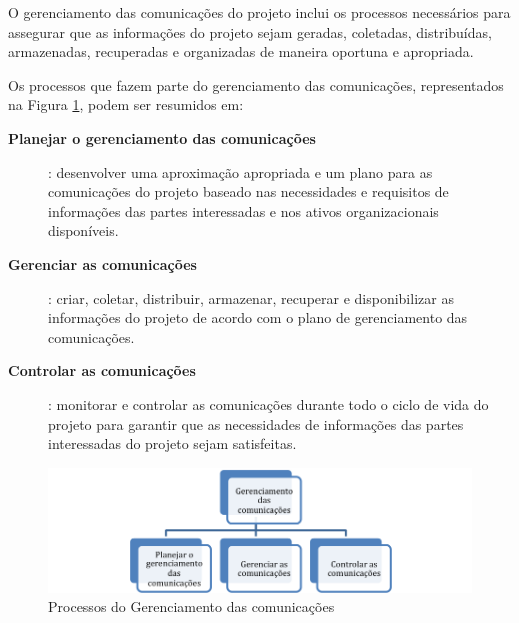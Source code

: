 


O gerenciamento das comunicações do projeto inclui os processos necessários para assegurar que as informações do projeto sejam geradas, coletadas, distribuídas, armazenadas, recuperadas e organizadas de maneira oportuna e apropriada.

Os processos que fazem parte do gerenciamento das comunicações, representados na Figura \ref{fig:proc:ger:comunic}, podem ser resumidos em:

\begin{description}
	
	\item[\textbf{Planejar o gerenciamento das comunicações}]: desenvolver uma aproximação apropriada e um plano para as comunicações do projeto baseado nas necessidades e requisitos de informações das partes interessadas e nos ativos organizacionais disponíveis.
	
	\item[\textbf{Gerenciar as comunicações}]: criar, coletar, distribuir, armazenar, recuperar e disponibilizar as informações do projeto de acordo com o plano de gerenciamento das comunicações.
	
	\item[\textbf{Controlar as comunicações}]: monitorar e controlar as comunicações durante todo o ciclo de vida do projeto para garantir que as necessidades de informações das partes interessadas do projeto sejam satisfeitas.

\end{description}

\begin{figure}[!h]
	\centering
	\includegraphics[scale=0.75]{Figuras/gerenciamento_comunicacoes.png}
	\caption{Processos do Gerenciamento das comunicações}
	\label{fig:proc:ger:comunic}
\end{figure}


